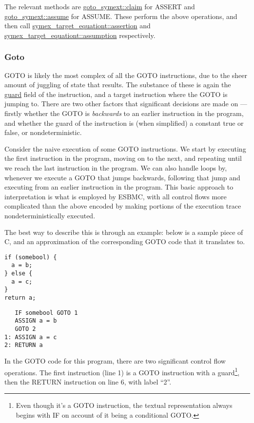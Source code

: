 \documentclass{article}
\begin{document}
The relevant methods are \url{goto_symext::claim} for ASSERT and
\url{goto_symext::assume} for ASSUME. These perform the above operations,
and then call \url{symex_target_equationt::assertion} and
\url{symex_target_equationt::assumption} respectively.

\subsubsection{Goto}

GOTO is likely the most complex of all the GOTO instructions, due to the sheer
amount of juggling of state that results. The substance of these is again
the \url{guard} field of the instruction, and a target instruction where the
GOTO is jumping to. There are two other factors that significant decisions
are made on --- firstly whether the GOTO is \textit{backwards} to an earlier
instruction in the program, and whether the guard of the instruction is (when
simplified) a constant true or false, or nondeterministic.

Consider the naive execution of some GOTO instructions. We start by executing
the first instruction in the program, moving on to the next, and repeating until
we reach the last instruction in the program. We can also handle loops by,
whenever we execute a GOTO that jumps backwards, following that jump and
executing from an earlier instruction in the program. This basic approach to
interpretation is what is employed by ESBMC, with all control flows more
complicated than the above encoded by making portions of the execution trace
nondeterministically executed.

The best way to describe this is through an example: below is a sample piece
of C, and an approximation of the corresponding GOTO code that it translates to.

\begin{lstlisting}
if (somebool) {
  a = b;
} else {
  a = c;
}
return a;
\end{lstlisting}

\begin{lstlisting}
   IF somebool GOTO 1
   ASSIGN a = b
   GOTO 2
1: ASSIGN a = c
2: RETURN a
\end{lstlisting}

In the GOTO code for this program, there are two significant control flow
operations. The first instruction (line 1) is a GOTO instruction with a
guard\footnote{Even though it's a GOTO instruction, the textual representation
always begins with IF on account of it being a conditional GOTO.}, then the
RETURN instruction on line 6, with label ``2''.
\end{document}
